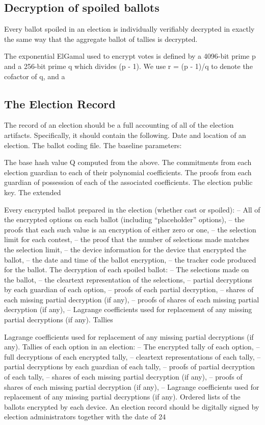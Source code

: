 \subsection{Decryption of spoiled ballots}
Every ballot spoiled in an election is individually verifiably decrypted in exactly the same way that the aggregate
ballot of tallies is decrypted.
\cite[21]{eg-spec}

The exponential ElGamal used to encrypt votes is defined by a 4096-bit prime p and a 256-bit prime q which divides (p -
1). We use r = (p - 1)/q to denote the cofactor of q, and a
\cite[21]{eg-spec}

\subsection{The Election Record}
The record of an election should be a full accounting of all of the election artifacts. Specifically, it should contain
the following. Date and location of an election. The ballot coding file. The baseline parameters:
\cite[24]{eg-spec}

The base hash value Q computed from the above. The commitments from each election guardian to each of their polynomial
coefficients. The proofs from each guardian of possession of each of the associated coefficients. The election public
key. The extended
\cite[24]{eg-spec}

Every encrypted ballot prepared in the election (whether cast or spoiled): – All of the encrypted options on each ballot
(including “placeholder” options), – the proofs that each such value is an encryption of either zero or one, – the
selection limit for each contest, – the proof that the number of selections made matches the selection limit, – the
device information for the device that encrypted the ballot, – the date and time of the ballot encryption, – the tracker
code produced for the ballot. The decryption of each spoiled ballot: – The selections made on the ballot, – the
cleartext representation of the selections, – partial decryptions by each guardian of each option, – proofs of each
partial decryption, – shares of each missing partial decryption (if any), – proofs of shares of each missing partial
decryption (if any), – Lagrange coefficients used for replacement of any missing partial decryptions (if any). Tallies
\cite[24]{eg-spec}


Lagrange coefficients used for replacement of any missing partial decryptions (if any). Tallies of each option in an
election: – The encrypted tally of each option, – full decryptions of each encrypted tally, – cleartext representations
of each tally, – partial decryptions by each guardian of each tally, – proofs of partial decryption of each tally, –
shares of each missing partial decryption (if any), – proofs of shares of each missing partial decryption (if any), –
Lagrange coefficients used for replacement of any missing partial decryptions (if any). Ordered lists of the ballots
encrypted by each device. An election record should be digitally signed by election administrators together with the
date of 24
\cite[24]{eg-spec}


